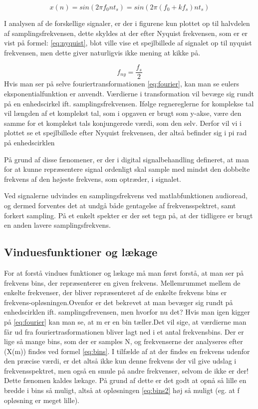 \begin{equation}\label{eq:sinus1}
{x(n)} = sin(2\pi f_0 n t_s) =sin(2\pi (f_0+kf_s) n t_s) 
\end{equation}

  
I analysen af de forskellige signaler, er der i figurene kun plottet op til halvdelen af samplingsfrekvensen, dette skyldes at der efter Nyquist frekvensen, som er er vist på formel: \eqref{eq:nyquist}, blot ville vise et spejlbillede af signalet op til nyquist frekvensen, men dette giver naturligvis ikke mening at kikke på.
 
  \begin{equation}\label{eq:nyquist}
  f_{ny} = \frac{f_s}{2} 
  \end{equation}
Hvis man ser på selve fouriertransformationen \eqref{eq:fourier}, kan man se eulers eksponentialfunktion er anvendt. Værdierne i transformation vil bevæge sig rundt på en enhedscirkel ift. samplingsfrekvensen.  Ifølge regnereglerne for komplekse tal vil længden af et komplekst tal, som i opgaven er brugt som y-akse, være den samme for et komplekst tals konjungerede værdi, som den selv. Derfor vil vi i plottet se et spejlbillede efter Nyquist frekvensen, der altså befinder sig i pi rad på enhedscirklen  
 
 På grund af disse fænomener, er der i digital signalbehandling defineret, at man for at kunne repræsentere signal ordenligt skal sample med mindst den dobbelte frekvens af den højeste frekvens, som optræder, i signalet.
 
  Ved signalerne udvindes en samplingsfrekvens ved matlabfunktionen audioread, og dermed forventes det at undgå både gentagelse af frekvensspektret, samt forkert sampling. På et enkelt spekter er der set tegn på, at der tidligere er brugt en anden lavere samplingsfrekvens.

\subsection{Vinduesfunktioner og lækage}
For at forstå vindues funktioner og lækage må man først forstå, at man ser på frekvens bins, der repræsenterer en given frekvens. Mellemrummet mellem de enkelte frekvenser, der bliver repræsenteret af de enkelte frekvens bins er frekvens-opløsningen.Ovenfor er det bekrevet at man bevæger sig rundt på enhedscirklen ift. samplingsfrevensen, men hvorfor nu det? Hvis man igen kigger på \eqref{eq:fourier} kan man se, at m er en bin tæller.Det vil sige, at værdierne man får ud fra fouriertrasformationen bliver lagt ned i et antal frekvensbins. Der er lige så mange bins, som der er samples N, og frekvenserne der analyseres efter (X(m)) findes ved formel \eqref{eq:bins}. I tilfælde af at der findes en frekvens udenfor den præcise værdi, er det altså ikke kun denne frekvens der vil give udslag i frekvensspektret, men også en smule på andre frekvenser, selvom de ikke er der! Dette fænomen kaldes lækage. På grund af dette er det godt at opnå så lille en bredde i bins så muligt, altså at opløsningen \eqref{eq:bins2} høj så muligt (eg. at f opløsning er meget lille).  

